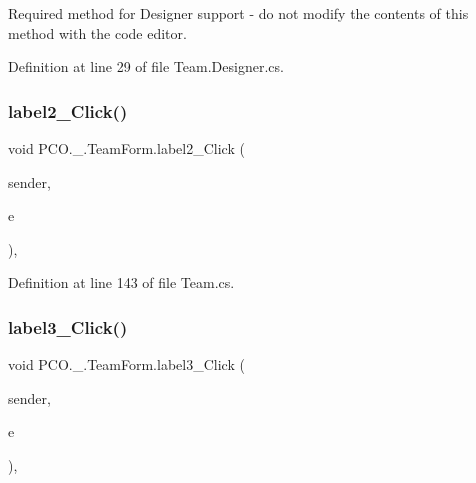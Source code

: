 Required method for Designer support -\/ do not modify the contents of this method with the code editor. 



Definition at line 29 of file Team.\+Designer.\+cs.

\mbox{\label{classPCO_1_1__0_1_1TeamForm_a22becf6adc591129aab673894df17e50}} 
\subsubsection{\texorpdfstring{label2\+\_\+\+Click()}{label2\_Click()}}
{\footnotesize\ttfamily void P\+C\+O.\+\_.\+Team\+Form.\+label2\+\_\+\+Click (\begin{DoxyParamCaption}\item[{object}]{sender,  }\item[{Event\+Args}]{e }\end{DoxyParamCaption})\hspace{0.3cm}{\ttfamily [inline]}, {\ttfamily [private]}}



Definition at line 143 of file Team.\+cs.

\mbox{\label{classPCO_1_1__0_1_1TeamForm_affe7a93b62d0e51f0bd8ad1cd0e36fe3}} 
\subsubsection{\texorpdfstring{label3\+\_\+\+Click()}{label3\_Click()}}
{\footnotesize\ttfamily void P\+C\+O.\+\_.\+Team\+Form.\+label3\+\_\+\+Click (\begin{DoxyParamCaption}\item[{object}]{sender,  }\item[{Event\+Args}]{e }\end{DoxyParamCaption})\hspace{0.3cm}{\ttfamily [inline]}, {\ttfamily [private]}}



